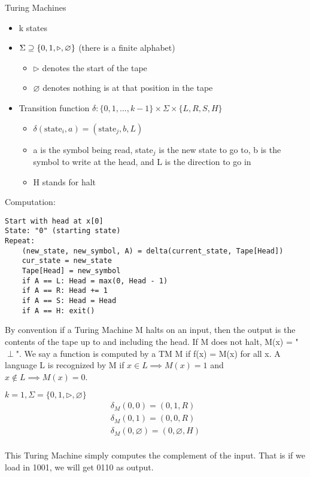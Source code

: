 \begin{definition}
    Turing Machines

    \begin{itemize}
        \item k states
        \item $\Sigma \supseteq \{ 0, 1, \triangleright, \null \varnothing \}$ (there is a finite alphabet)
        \begin{itemize}
            \item $\triangleright$ denotes the start of the tape
            \item $\varnothing$ denotes nothing is at that position in the tape
        \end{itemize}
        \item Transition function $\delta: \{0, 1, ..., k - 1 \} \times \Sigma \times \{ L, R, S, H \}$
        \begin{itemize}
            \item $\delta(\text{state}_i, a) = (\text{state}_j, b, L)$
            \item a is the symbol being read, state$_j$ is the new state to go to, b is the symbol to write at the head, and L is the direction to go in
            \item H stands for halt
        \end{itemize}
    \end{itemize}
\end{definition}

Computation:
\begin{verbatim}
Start with head at x[0]
State: "0" (starting state)
Repeat:
    (new_state, new_symbol, A) = delta(current_state, Tape[Head])
    cur_state = new_state
    Tape[Head] = new_symbol
    if A == L: Head = max(0, Head - 1)
    if A == R: Head += 1
    if A == S: Head = Head
    if A == H: exit()
\end{verbatim}

By convention if a Turing Machine M halts on an input, then the output is the contents of the tape up to and including the head. If M does not halt, M(x) = "$\perp$". We say a function is computed by a TM M if f(x) = M(x) for all x. A language L is recognized by M if $x \in L \implies M(x) = 1$ and $x \notin L \implies M(x) = 0$.

\begin{example}
    
    $ k = 1, \Sigma = \{0, 1, \triangleright, \varnothing \}$
    \begin{gather*}
        \delta_M(0, 0) = (0, 1, R) \\
        \delta_M(0, 1) = (0, 0, R) \\ 
        \delta_M(0, \varnothing) = (0, \varnothing, H) \\
    \end{gather*}

    This Turing Machine simply computes the complement of the input. That is if we load in 1001, we will get 0110 as output. 

\end{example}

